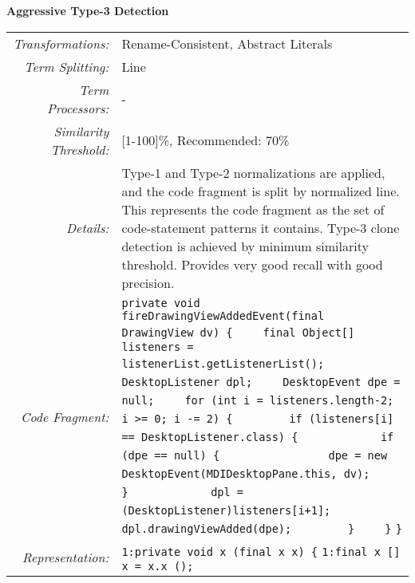 \documentclass[]{article}
\begin{document}
	\noindent\begin{minipage}{\textwidth}
		\noindent \textbf{Aggressive Type-3 Detection}\\
		\begin{tabular}{rp{12.5cm}}
			\bottomrule[2pt]
			\textit{Transformations:} & Rename-Consistent, Abstract Literals \\
			\textit{Term Splitting:}  & Line\\
			\textit{Term Processors:} & - \\
			\textit{Similarity Threshold:} & [1-100]\%, Recommended: 70\% \\
			\midrule
			\textit{Details:}         & Type-1 and Type-2 normalizations are applied, and the code fragment is split by normalized line.  This represents the code fragment as the set of code-statement patterns it contains.  Type-3 clone detection is achieved by minimum similarity threshold.  Provides very good recall with good precision.\\
			\midrule
			\textit{Code Fragment:} &
			\verb|private void fireDrawingViewAddedEvent(final DrawingView dv) {|\newline
			\verb|    final Object[] listeners = listenerList.getListenerList();|\newline
			\verb|    DesktopListener dpl;|\newline
			\verb|    DesktopEvent dpe = null;|\newline
			\verb|    for (int i = listeners.length-2; i >= 0; i -= 2) {|\newline
			\verb|        if (listeners[i] == DesktopListener.class) {|\newline
			\verb|            if (dpe == null) {|\newline
			\verb|                dpe = new DesktopEvent(MDIDesktopPane.this, dv);|\newline
			\verb|            }|\newline
			\verb|            dpl = (DesktopListener)listeners[i+1];|\newline
			\verb|            dpl.drawingViewAdded(dpe);|\newline
			\verb|        }|\newline
			\verb|    }|\newline
			\verb|}|\newline
			\\
			\textit{Representation:} & 
			\verb|1:private void x (final x x) {|\newline
			\verb|1:final x [] x = x.x ();|\newline

\end{tabular}
\end{minipage}
\end{document}
